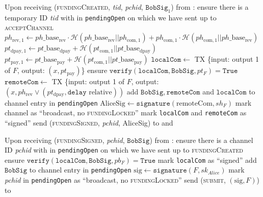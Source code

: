 \begin{algorithmic}[1]
    \State Upon receiving (\textsc{fundingCreated}, \textit{tid},
    \textit{pchid}, $\mathtt{BobSig}_1$) from \bob:
    \Indent
      \State ensure there is a temporary ID \textit{tid} with \bob{} in
      \texttt{pendingOpen} on which we have sent up to \textsc{acceptChannel}
      \State $ph_{\mathrm{rev}, 1} \gets ph\_\mathrm{base}_{\mathrm{rev}} \cdot
      \mathcal{H}\left(ph\_\mathrm{base}_{\mathrm{rev}} ||
      ph_{\mathrm{com}, 1}\right) + ph_{\mathrm{com}, 1} \cdot \mathcal{H}\left(
      ph_{\mathrm{com}, 1} || ph\_\mathrm{base}_{\mathrm{rev}}\right)$
      \State $pt_{\mathrm{dpay}, 1} \gets pt\_\mathrm{base}_{\mathrm{dpay}} +
      \mathcal{H}\left(pt_{\mathrm{com}, 1} ||
      pt\_\mathrm{base}_{\mathrm{dpay}}\right)$
      \State $pt_{\mathrm{pay}, 1} \gets pt\_\mathrm{base}_{\mathrm{pay}} +
      \mathcal{H}\left(pt_{\mathrm{com}, 1} ||
      pt\_\mathrm{base}_{\mathrm{pay}}\right)$
      \State $\mathtt{localCom} \gets$ TX \{input: output 1 of $F$, output:
      $\left(x, pt_{\mathrm{pay}}\right)$\}
      \State ensure $\mathtt{verify}\left(\mathtt{localCom}, \mathtt{BobSig},
      pt_F\right) = \mathtt{True}$
      \State $\mathtt{remoteCom} \gets$ TX \{input: output 1 of $F$, output:
      $\left(x, ph_{\mathrm{rev}} \vee \left(pt_{\mathrm{dpay}}, \mathtt{delay}
      \text{ relative}\right)\right)$ 
      \State add $\mathtt{BobSig}, \mathtt{remoteCom}$ and $\mathtt{localCom}$
      to channel entry in \texttt{pendingOpen}
      \State $\mathrm{AliceSig} \gets
      \mathtt{signature}\left(\mathrm{remoteCom}, sh_F\right)$
      \State mark channel as ``broadcast, no \textsc{fundingLocked}''
      \State mark \texttt{localCom} and \texttt{remoteCom} as ``signed''
      \State send (\textsc{fundingSigned}, \textit{pchid}, AliceSig) to \bob{}
      and \adversary
    \EndIndent
    \State

    \State Upon receiving (\textsc{fundingSigned}, \textit{pchid},
    $\mathtt{BobSig}$) from \bob:
    \Indent
      \State ensure there is a channel ID \textit{pchid} with \bob{} in
      \texttt{pendingOpen} on which we have sent up to \textsc{fundingCreated}
      \State ensure $\mathtt{verify}\left(\mathtt{localCom}, \mathtt{BobSig},
      pb_F\right) = \mathtt{True}$
      \State mark \texttt{localCom} as ``signed''
      \State add $\mathtt{BobSig}$ to channel entry in \texttt{pendingOpen}
      \State $\mathrm{sig} \gets \mathtt{signature}\left(F,
      sk_{\mathit{Alice}}\right)$
      \State mark \textit{pchid} in \texttt{pendingOpen} as ``broadcast, no
      \textsc{fundingLocked}''
      \State send (\textsc{submit}, $\left(\mathrm{sig}, F\right)$) to \ledger
    \EndIndent
    \State


\end{algorithmic}
